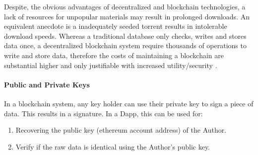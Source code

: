 	
	Despite, the obvious advantages of decentralized and blockchain technologies,  a lack of resources for unpopular materials may result in prolonged downloads. An equivalent anecdote is a inadequately seeded torrent results in intolerable download speeds.  Whereas a traditional database only checks, writes and stores data once, a decentralized blockchain system require thousands of operations to write and store data, therefore the costs of maintaining a blockchain are substantial higher and only justifiable with increased utility/security \cite{EthScale:Online}. 
	
	
	\paragraph{Public and Private Keys}
	 In a \gls{blockchain} system, any key holder can use their private key to sign a piece of data. This results in a signature.  
	  In a \gls{Dapp}, this can be used for:
	 \begin{enumerate}
		\item Recovering the public key (ethereum account address) of the Author.
		\item Verify if the raw data is identical  using the Author's public key. 
	\end{enumerate}
	
